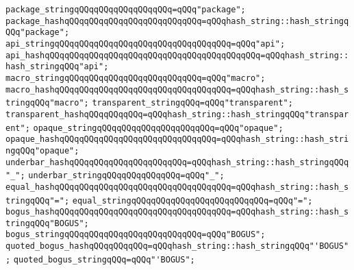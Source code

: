 \newline
\verb|package_stringqQQqqQQqqQQqqQQqqQQq=qQQq"package";|\newline
\verb|package_hashqQQqqQQqqQQqqQQqqQQqqQQqqQQq=qQQqhash_string::hash_stringqQQq"package";|\newline
\newline
\verb|api_stringqQQqqQQqqQQqqQQqqQQqqQQqqQQqqQQqqQQq=qQQq"api";|\newline
\verb|api_hashqQQqqQQqqQQqqQQqqQQqqQQqqQQqqQQqqQQqqQQqqQQq=qQQqhash_string::hash_stringqQQq"api";|\newline
\newline
\verb|macro_stringqQQqqQQqqQQqqQQqqQQqqQQqqQQq=qQQq"macro";|\newline
\verb|macro_hashqQQqqQQqqQQqqQQqqQQqqQQqqQQqqQQqqQQq=qQQqhash_string::hash_stringqQQq"macro";|\newline
\newline
\verb|transparent_stringqQQq=qQQq"transparent";|\newline
\verb|transparent_hashqQQqqQQqqQQq=qQQqhash_string::hash_stringqQQq"transparent";|\newline
\newline
\verb|opaque_stringqQQqqQQqqQQqqQQqqQQqqQQq=qQQq"opaque";|\newline
\verb|opaque_hashqQQqqQQqqQQqqQQqqQQqqQQqqQQqqQQq=qQQqhash_string::hash_stringqQQq"opaque";|\newline
\newline
\verb|underbar_hashqQQqqQQqqQQqqQQqqQQqqQQq=qQQqhash_string::hash_stringqQQq"_";|\newline
\verb|underbar_stringqQQqqQQqqQQqqQQq=qQQq"_";|\newline
\newline
\verb|equal_hashqQQqqQQqqQQqqQQqqQQqqQQqqQQqqQQqqQQq=qQQqhash_string::hash_stringqQQq"=";|\newline
\verb|equal_stringqQQqqQQqqQQqqQQqqQQqqQQqqQQq=qQQq"=";|\newline
\newline
\verb|bogus_hashqQQqqQQqqQQqqQQqqQQqqQQqqQQqqQQqqQQq=qQQqhash_string::hash_stringqQQq"BOGUS";|\newline
\verb|bogus_stringqQQqqQQqqQQqqQQqqQQqqQQqqQQq=qQQq"BOGUS";|\newline
\newline
\verb|quoted_bogus_hashqQQqqQQqqQQq=qQQqhash_string::hash_stringqQQq"'BOGUS";|\newline
\verb|quoted_bogus_stringqQQq=qQQq"'BOGUS";|\newline
